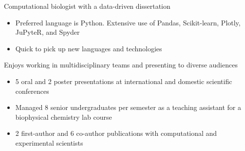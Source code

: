 

\begin{cventries}
\vspace{-4.0mm}

  \cventry
    {} %
    {} %
    {} %
    {} %
    {
      \begin{cvitems} %
        \item {Computational biologist with a data-driven dissertation}
        \begin{itemize}
       	 	\item Preferred language is Python. Extensive use of Pandas, Scikit-learn, Plotly, JuPyteR, and Spyder 
       	 	\item Quick to pick up new languages and technologies
        \end{itemize}
        \vspace{1.0mm}
        \item {Enjoys working in multidisciplinary teams and presenting to diverse audiences}
        \begin{itemize}
         	\item 5 oral and 2 poster presentations at international and domestic scientific conferences
         	\item Managed 8 senior undergraduates per semester as a teaching assistant for a biophysical chemistry lab course
         	\item 2 first-author and 6 co-author publications with computational and experimental scientists
        \end{itemize}
      \end{cvitems}
    }
\vspace{-4.0mm}
\end{cventries}
